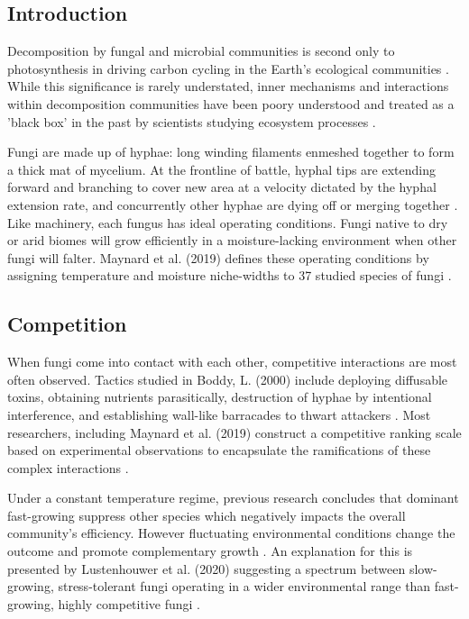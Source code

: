 \documentclass[12pt]{article}
\begin{document}
\begin{multicols}{2}
	
	
\section{Introduction}

Decomposition by fungal and microbial communities is second only to photosynthesis in driving carbon cycling in the Earth's ecological communities \cite{McGuire2010}. While this significance is rarely understated, inner mechanisms and interactions within decomposition communities have been poory understood and treated as a 'black box' in the past by scientists studying ecosystem processes \cite{Andren1999}.

Fungi are made up of hyphae: long winding filaments enmeshed together to form a thick mat of mycelium. At the frontline of battle, hyphal tips are extending forward and branching to cover new area at a velocity dictated by the hyphal extension rate, and concurrently other hyphae are dying off or merging together \cite{Edelstein1982}. Like machinery, each fungus has ideal operating conditions. Fungi native to dry or arid biomes will grow efficiently in a moisture-lacking environment when other fungi will falter. Maynard et al. (2019) defines these operating conditions by assigning temperature and moisture niche-widths to 37 studied species of fungi \cite{Maynard2019}.

\subsection{Competition}
When fungi come into contact with each other, competitive interactions are most often observed. Tactics studied in Boddy, L. (2000) include deploying diffusable toxins, obtaining nutrients parasitically, destruction of hyphae by intentional interference, and establishing wall-like barracades to thwart attackers \cite{Boddy2000}. Most researchers, including Maynard et al. (2019) construct a competitive ranking scale based on experimental observations to encapsulate the ramifications of these complex interactions \cite{Maynard2019}.

Under a constant temperature regime, previous research concludes that dominant fast-growing suppress other species which negatively impacts the overall community's efficiency. However fluctuating environmental conditions change the outcome and promote complementary growth \cite{Toljander2006}. An explanation for this is presented by Lustenhouwer et al. (2020) suggesting a spectrum between slow-growing, stress-tolerant fungi operating in a wider environmental range than fast-growing, highly competitive fungi \cite{Lustenhouwer2020}. 


\end{multicols}
\end{document}
